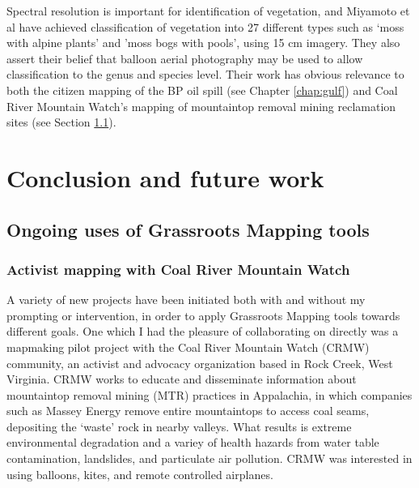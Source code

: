 \documentclass[11pt,oneside,notitlepage]{report}
\begin{document}

Spectral resolution is important for identification of vegetation, and Miyamoto et al have achieved classification of vegetation into 27 different types such as `moss with alpine plants' and 'moss bogs with pools', using 15 cm imagery. They also assert their belief that balloon aerial photography may be used to allow classification to the genus and species level. \cite{miyamoto2004use} Their work has obvious relevance to both the citizen mapping of the BP oil spill (see Chapter \ref{chap:gulf}) and Coal River Mountain Watch's mapping of mountaintop removal mining reclamation sites (see Section \ref{sec:ongoinguses}).

\chapter{Conclusion and future work}

\section{Ongoing uses of Grassroots Mapping tools}
\label{sec:ongoinguses}

\subsection{Activist mapping with Coal River Mountain Watch}

A variety of new projects have been initiated both with and without my prompting or intervention, in order to apply Grassroots Mapping tools towards different goals. One which I had the pleasure of collaborating on directly was a mapmaking pilot project with the Coal River Mountain Watch (CRMW) community, an activist and advocacy organization based in Rock Creek, West Virginia. CRMW works to educate and disseminate information about mountaintop removal mining (MTR) practices in Appalachia, in which companies such as Massey Energy remove entire mountaintops to access coal seams, depositing the `waste' rock in nearby valleys. What results is extreme environmental degradation and a variey of health hazards from water table contamination, landslides, and particulate air pollution. CRMW was interested in using balloons, kites, and remote controlled airplanes. 

\end{document}
